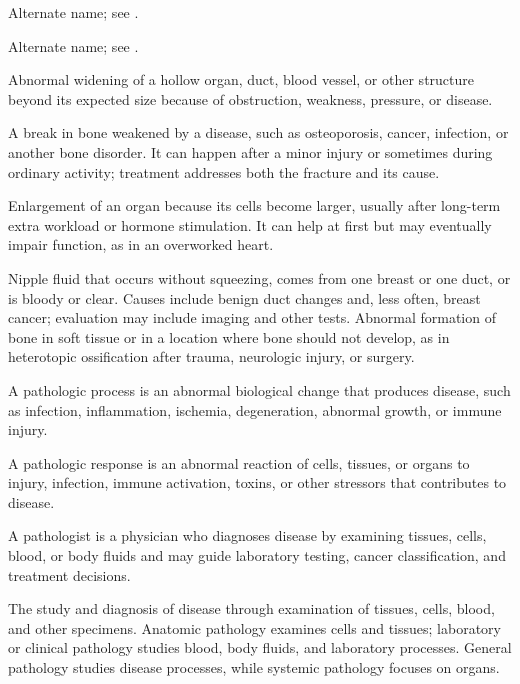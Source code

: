  Alternate name; see .

 Alternate name; see .

 Abnormal widening of a hollow organ, duct, blood vessel, or other structure beyond its expected size because of obstruction, weakness, pressure, or disease.

 A break in bone weakened by a disease, such as osteoporosis, cancer, infection, or another bone disorder. It can happen after a minor injury or sometimes during ordinary activity; treatment addresses both the fracture and its cause.

 Enlargement of an organ because its cells become larger, usually after long-term extra workload or hormone stimulation. It can help at first but may eventually impair function, as in an overworked heart.

 Nipple fluid that occurs without squeezing, comes from one breast or one duct, or is bloody or clear. Causes include benign duct changes and, less often, breast cancer; evaluation may include imaging and other tests.
 Abnormal formation of bone in soft tissue or in a location where bone should not develop, as in heterotopic ossification after trauma, neurologic injury, or surgery.

 A pathologic process is an abnormal biological change that produces disease, such as infection, inflammation, ischemia, degeneration, abnormal growth, or immune injury.

 A pathologic response is an abnormal reaction of cells, tissues, or organs to injury, infection, immune activation, toxins, or other stressors that contributes to disease.

 A pathologist is a physician who diagnoses disease by examining tissues, cells, blood, or body fluids and may guide laboratory testing, cancer classification, and treatment decisions.

 The study and diagnosis of disease through examination of tissues, cells, blood, and other specimens. Anatomic pathology examines cells and tissues; laboratory or clinical pathology studies blood, body fluids, and laboratory processes. General pathology studies disease processes, while systemic pathology focuses on organs.

